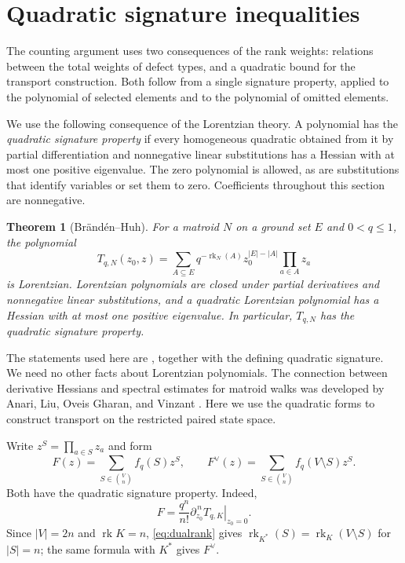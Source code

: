 \documentclass[11pt]{article}
\newtheorem{theorem}{Theorem}[section]
\theoremstyle{definition}
\newcommand{\rank}{\operatorname{rk}}
\begin{document}
\section{Quadratic signature inequalities}\label{sec:algebra}

The counting argument uses two consequences of the rank weights:
relations between the total weights of defect types, and a quadratic
bound for the transport construction.  Both follow from a single
signature property, applied to the polynomial of selected elements
and to the polynomial of omitted elements.

We use the following consequence of the Lorentzian theory.  A polynomial
has the \emph{quadratic signature property} if every homogeneous quadratic
obtained from it by partial differentiation and nonnegative linear
substitutions has a Hessian with at most one positive eigenvalue.  The
zero polynomial is allowed, as are substitutions that identify variables
or set them to zero.  Coefficients throughout this section are
nonnegative.

\begin{theorem}[Br\"and\'en--Huh]\label{thm:BH}
For a matroid $N$ on a ground set $E$ and $0<q\le1$, the polynomial
\[
 T_{q,N}(z_0,z)=\sum_{A\subseteq E}
        q^{-\rank_N(A)}z_0^{|E|-|A|}\prod_{a\in A}z_a
\]
is Lorentzian.  Lorentzian polynomials are closed under partial
derivatives and nonnegative linear substitutions, and a quadratic
Lorentzian polynomial has a Hessian with at most one positive eigenvalue.
In particular, $T_{q,N}$ has the quadratic signature property.
\end{theorem}

The statements used here are \cite[Theorem~4.10, Theorem~2.10, and
Corollary~2.11]{BH2020}, together with the defining quadratic signature.
We need no other facts about Lorentzian polynomials.
The connection between derivative Hessians and spectral estimates for
matroid walks was developed by Anari, Liu, Oveis Gharan, and Vinzant
\cite[arXiv version~3, Proposition~4.1]{ALOV2024}.
Here we use the quadratic forms to construct transport on the restricted
paired state space.

Write $z^S=\prod_{a\in S}z_a$ and form
\begin{equation}\label{eq:bothpolynomials}
 F(z)=\sum_{S\in\binom Vn} f_q(S)z^S,
 \qquad
 F^\vee(z)=\sum_{S\in\binom Vn}f_q(V\setminus S)z^S.
\end{equation}
Both have the quadratic signature property.  Indeed,
\[
 F=\frac{q^n}{n!}\left.\partial_{z_0}^{\,n}T_{q,K}\right|_{z_0=0}.
\]
Since $|V|=2n$ and $\rank K=n$, \eqref{eq:dualrank} gives
$\rank_{K^*}(S)=\rank_K(V\setminus S)$ for $|S|=n$; the same formula
with $K^*$ gives $F^\vee$.
\end{document}
